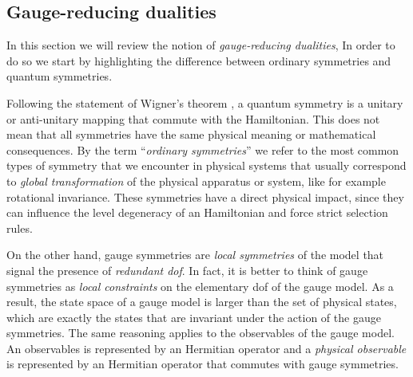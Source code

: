 \begin{figure}[t]
\end{figure}


%
%
\subsection{Gauge-reducing dualities}%
\label{sub:gauge_reducing_dualities}

In this section we will review the notion of \emph{gauge-reducing dualities},
In order to do so we start by highlighting the difference between ordinary symmetries and quantum symmetries.

Following the statement of Wigner's theorem \cite{wigner2012group}, a quantum symmetry is a unitary or anti-unitary mapping that commute with the Hamiltonian.
This does not mean that all symmetries have the same physical meaning or mathematical consequences.
By the term ``\emph{ordinary symmetries}'' we refer to the most common types of symmetry that we encounter in physical systems that usually correspond to \emph{global transformation} of the physical apparatus or system, like for example rotational invariance.
These symmetries have a direct physical impact, since they can influence the level degeneracy of an Hamiltonian and force strict selection rules.

On the other hand, gauge symmetries are \emph{local symmetries} of the model that signal the presence of \emph{redundant \ac{dof}}.
In fact, it is better to think of gauge symmetries as \emph{local constraints} on the elementary \ac{dof} of the gauge model.
As a result, the state space of a gauge model is larger than the set of physical states, which are exactly the states that are invariant under the action of the gauge symmetries.
The same reasoning applies to the observables of the gauge model.
An observables is represented by an Hermitian operator and a \emph{physical observable} is represented by an Hermitian operator that commutes with gauge symmetries.


